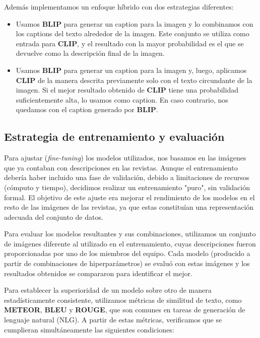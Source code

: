 \documentclass[14pt]{extarticle}
\begin{document}
Además implementamos un enfoque híbrido con dos estrategias diferentes:
\begin{itemize}
    \item Usamos \textbf{BLIP} para generar un caption para la imagen y lo combinamos con los captions del texto alrededor de la imagen. Este conjunto se utiliza como entrada para \textbf{CLIP}, y el resultado con la mayor probabilidad es el que se devuelve como la descripción final de la imagen.
    \item Usamos \textbf{BLIP} para generar un caption para la imagen y, luego, aplicamos \textbf{CLIP} de la manera descrita previamente solo con el texto circundante de la imagen. Si el mejor resultado obtenido de \textbf{CLIP} tiene una probabilidad suficientemente alta, lo usamos como caption. En caso contrario, nos quedamos con el caption generado por \textbf{BLIP}.
\end{itemize}

\subsection{Estrategia de entrenamiento y evaluación}

Para ajustar (\textit{fine-tuning}) los modelos utilizados, nos basamos en las imágenes que ya contaban con descripciones en las revistas. Aunque el entrenamiento debería haber incluido una fase de validación, debido a limitaciones de recursos (cómputo y tiempo), decidimos realizar un entrenamiento "puro", sin validación formal. El objetivo de este ajuste era mejorar el rendimiento de los modelos en el resto de las imágenes de las revistas, ya que estas constituían una representación adecuada del conjunto de datos.

Para evaluar los modelos resultantes y sus combinaciones, utilizamos un conjunto de imágenes diferente al utilizado en el entrenamiento, cuyas descripciones fueron proporcionadas por uno de los miembros del equipo. Cada modelo (producido a partir de combinaciones de hiperparámetros) se evaluó con estas imágenes y los resultados obtenidos se compararon para identificar el mejor.

Para establecer la superioridad de un modelo sobre otro de manera estadísticamente consistente, utilizamos métricas de similitud de texto, como \textbf{METEOR}, \textbf{BLEU} y \textbf{ROUGE}, que son comunes en tareas de generación de lenguaje natural (NLG). A partir de estas métricas, verificamos que se cumplieran simultáneamente las siguientes condiciones:
\end{document}
